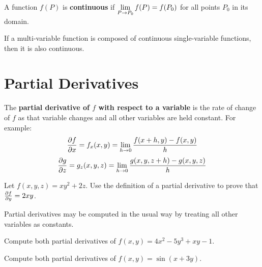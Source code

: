 \documentclass[letterpaper, twoside, 12pt]{book}
\begin{document}
\begin{definition}
  A function $f(P)$ is \textbf{continuous} if
  $\displaystyle \lim_{P\to P_0}f(P) = f(P_0)$ for all points $P_0$ in its domain.
\end{definition}

\begin{theorem}
  If a multi-variable function is composed of continuous single-variable
  functions, then it is also continuous.
\end{theorem}


\section{Partial Derivatives} %

\begin{definition}
  The \textbf{partial derivative of $f$ with respect to a variable} is
  the rate of change of $f$ as that variable changes and all other variables
  are held constant. For example:
  \[\frac{\partial f}{\partial x}=f_x(x,y)=\lim_{h\to0}\frac{f(x+h,y)-f(x,y)}{h}\]
  \[\frac{\partial g}{\partial z}=g_z(x,y,z)=\lim_{h\to0}\frac{g(x,y,z+h)-g(x,y,z)}{h}\]
\end{definition}

          \begin{problem}
            Let $f(x,y,z)=xy^2+2z$.
            Use the definition of a partial derivative to prove that
            $\frac{\partial f}{\partial y} = 2xy$.
          \end{problem}

          \begin{solution}

          \end{solution}

\begin{theorem}
  Partial derivatives may be computed in the usual way by treating
  all other variables as constants.
\end{theorem}

          \begin{problem}
            Compute both partial derivatives of $f(x,y)=4x^2-5y^3+xy-1$.
          \end{problem}

          \begin{solution}

          \end{solution}

          \begin{problem}
            Compute both partial derivatives of $f(x,y)=\sin(x+3y)$.
          \end{problem}
\end{document}
